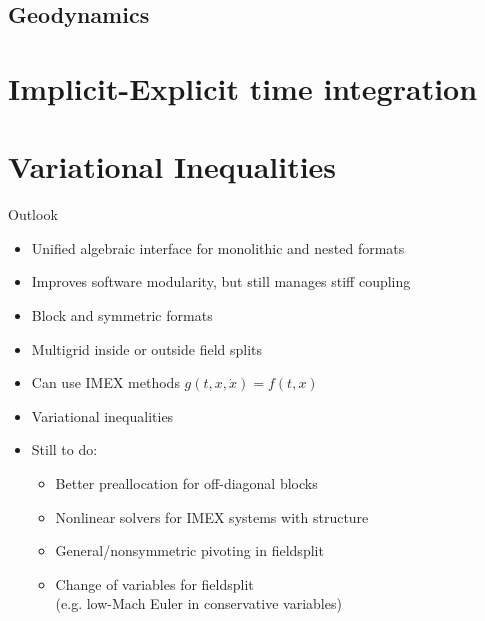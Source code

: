 \documentclass{beamer}
\begin{document}
\subsection{Geodynamics}


\section{Implicit-Explicit time integration}


\section{Variational Inequalities}


\begin{frame}{Outlook}
  \begin{itemize}
  \item Unified algebraic interface for monolithic and nested formats
  \item Improves software modularity, but still manages stiff coupling
  \item Block and symmetric formats
  \item Multigrid inside or outside field splits
  \item Can use IMEX methods $g(t,x,\dot x) = f(t,x)$
  \item Variational inequalities
  \item Still to do:
    \begin{itemize}
    \item Better preallocation for off-diagonal blocks
    \item Nonlinear solvers for IMEX systems with structure
    \item General/nonsymmetric pivoting in fieldsplit
    \item Change of variables for fieldsplit \\ (e.g. low-Mach Euler in conservative variables)
    \end{itemize}
  \end{itemize}
\end{frame}
\end{document}
